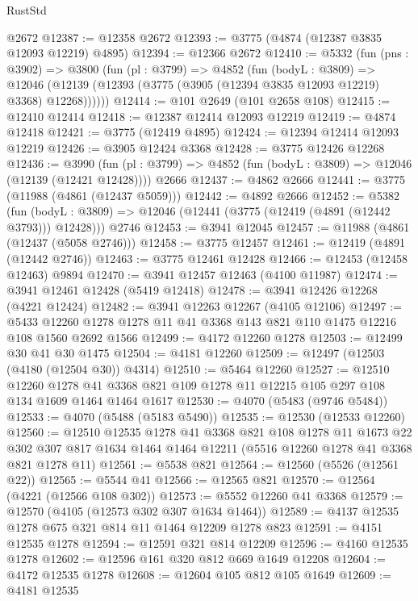 \begin{lexlean}{RustStd}
\begin{coremodule}
{\begin{coremodule}
{{{{{{{{{{{{{{{{{{{{{{{{{{{{{{{    @2672
@12387 := @12358 @2672
@12393 := @3775 (@4874 (@12387 @3835 @12093 @12219) @4895)
@12394 := @12366 @2672
@12410 := @5332
    (fun (pns : @3902) =>
    @3800
      (fun (pl : @3799) =>
      @4852
        (fun (bodyL : @3809) =>
        @12046 (@12139 (@12393 (@3775 (@3905 (@12394 @3835 @12093 @12219) @3368) @12268))))))
@12414 := @101 @2649 (@101 @2658 @108)
@12415 := @12410 @12414
@12418 := @12387 @12414 @12093 @12219
@12419 := @4874 @12418
@12421 := @3775 (@12419 @4895)
@12424 := @12394 @12414 @12093 @12219
@12426 := @3905 @12424 @3368
@12428 := @3775 @12426 @12268
@12436 := @3990
    (fun (pl : @3799) => @4852 (fun (bodyL : @3809) => @12046 (@12139 (@12421 @12428))))
    @2666
@12437 := @4862 @2666
@12441 := @3775 (@11988 (@4861 (@12437 @5059)))
@12442 := @4892 @2666
@12452 := @5382
    (fun (bodyL : @3809) => @12046 (@12441 (@3775 (@12419 (@4891 (@12442 @3793))) @12428)))
    @2746
@12453 := @3941 @12045
@12457 := @11988 (@4861 (@12437 (@5058 @2746)))
@12458 := @3775 @12457
@12461 := @12419 (@4891 (@12442 @2746))
@12463 := @3775 @12461 @12428
@12466 := @12453 (@12458 @12463) @9894
@12470 := @3941 @12457 @12463 (@4100 @11987)
@12474 := @3941 @12461 @12428 (@5419 @12418)
@12478 := @3941 @12426 @12268 (@4221 @12424)
@12482 := @3941 @12263 @12267 (@4105 @12106)
@12497 := @5433 @12260 @1278 @1278 @11 @41 @3368 @143 @821 @110 @1475 @12216 @108 @1560 @2692 @1566
@12499 := @4172 @12260 @1278
@12503 := @12499 @30 @41 @30 @1475
@12504 := @4181 @12260
@12509 := @12497 (@12503 (@4180 (@12504 @30)) @4314)
@12510 := @5464 @12260
@12527 := @12510
    @12260
    @1278
    @41
    @3368
    @821
    @109
    @1278
    @11
    @12215
    @105
    @297
    @108
    @134
    @1609
    @1464
    @1464
    @1617
@12530 := @4070 (@5483 (@9746 @5484))
@12533 := @4070 (@5488 (@5183 @5490))
@12535 := @12530 (@12533 @12260)
@12560 := @12510
    @12535
    @1278
    @41
    @3368
    @821
    @108
    @1278
    @11
    @1673
    @22
    @302
    @307
    @817
    @1634
    @1464
    @1464
    @12211
    (@5516 @12260 @1278 @41 @3368 @821 @1278 @11)
@12561 := @5538 @821
@12564 := @12560 (@5526 (@12561 @22))
@12565 := @5544 @41
@12566 := @12565 @821
@12570 := @12564 (@4221 (@12566 @108 @302))
@12573 := @5552 @12260 @41 @3368
@12579 := @12570 (@4105 (@12573 @302 @307 @1634 @1464))
@12589 := @4137 @12535 @1278 @675 @321 @814 @11 @1464 @12209 @1278 @823
@12591 := @4151 @12535 @1278
@12594 := @12591 @321 @814 @12209
@12596 := @4160 @12535 @1278
@12602 := @12596 @161 @320 @812 @669 @1649 @12208
@12604 := @4172 @12535 @1278
@12608 := @12604 @105 @812 @105 @1649
@12609 := @4181 @12535
}}}}}}}}}}}}}}}}}}}}}}}}}}}}}}}
\end{coremodule}}
\end{coremodule}
\end{lexlean}
